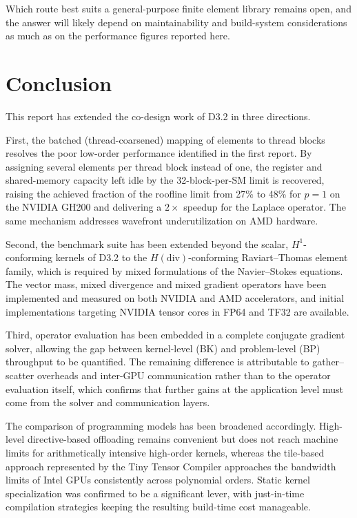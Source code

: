 \documentclass[a4paper,12pt]{article}
\begin{document}
Which route best suits a general-purpose finite element library remains open, and the answer will likely depend on maintainability and build-system considerations as much as on the performance figures reported here.

\newpage

%
%


\newpage 

\section{Conclusion}
\label{sec:conclusion}

This report has extended the co-design work of D3.2 in three directions.

First, the batched (thread-coarsened) mapping of elements to thread blocks resolves the poor low-order performance identified in the first report.
By assigning several elements per thread block instead of one, the register and shared-memory capacity left idle by the 32-block-per-SM limit is recovered, raising the achieved fraction of the roofline limit from 27\% to 48\% for $p=1$ on the NVIDIA GH200 and delivering a $2\times$ speedup for the Laplace operator.
The same mechanism addresses wavefront underutilization on AMD hardware.

Second, the benchmark suite has been extended beyond the scalar, $H^1$-conforming kernels of D3.2 to the $H(\mathrm{div})$-conforming Raviart--Thomas element family, which is required by mixed formulations of the Navier--Stokes equations.
The vector mass, mixed divergence and mixed gradient operators have been implemented and measured on both NVIDIA and AMD accelerators, and initial implementations targeting NVIDIA tensor cores in FP64 and TF32 are available.

Third, operator evaluation has been embedded in a complete conjugate gradient solver, allowing the gap between kernel-level (BK) and problem-level (BP) throughput to be quantified.
The remaining difference is attributable to gather--scatter overheads and inter-GPU communication rather than to the operator evaluation itself, which confirms that further gains at the application level must come from the solver and communication layers.

The comparison of programming models has been broadened accordingly.
High-level directive-based offloading remains convenient but does not reach machine limits for arithmetically intensive high-order kernels, whereas the tile-based approach represented by the Tiny Tensor Compiler approaches the bandwidth limits of Intel GPUs consistently across polynomial orders.
Static kernel specialization was confirmed to be a significant lever, with just-in-time compilation strategies keeping the resulting build-time cost manageable.
\end{document}
